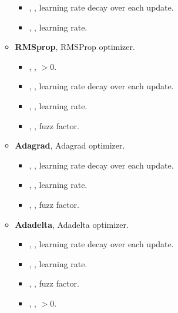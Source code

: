 \begin{itemize}
\begin{itemize}
\begin{itemize}
          \item {}, , learning rate decay over each update.
          \item {}, , learning rate.
        \end{itemize}
      \item \textbf{RMSprop}, RMSProp optimizer.
        \begin{itemize}
          \item {}, , $> 0$.
          \item {}, , learning rate decay over each update.
          \item {}, , learning rate.
          \item {}, , fuzz factor.
        \end{itemize}
      \item \textbf{Adagrad}, Adagrad optimizer.
        \begin{itemize}
          \item {}, , learning rate decay over each update.
          \item {}, , learning rate.
          \item {}, , fuzz factor.
        \end{itemize}
      \item \textbf{Adadelta}, Adadelta optimizer.
        \begin{itemize}
          \item {}, , learning rate decay over each update.
          \item {}, , learning rate.
          \item {}, , fuzz factor.
          \item {}, , $> 0$.

\end{itemize}
\end{itemize}
\end{itemize}
